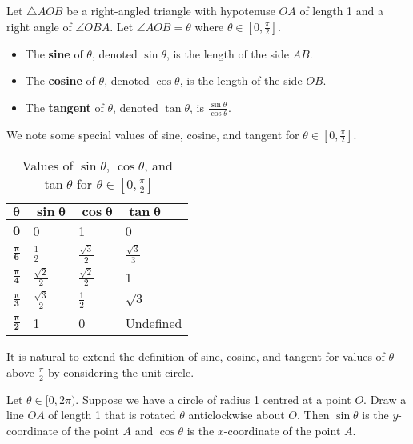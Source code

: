 \begin{definition}
    Let $\triangle AOB$ be a right-angled triangle with hypotenuse $OA$ of length 1 and a right angle of $\angle OBA$. Let $\angle AOB = \theta$ where $\theta \in [0, \frac\pi2]$.
    \begin{itemize}
        \item The \textbf{sine} of $\theta$, denoted $\sin\theta$, is the length of the side $AB$.
        \item The \textbf{cosine} of $\theta$, denoted $\cos\theta$, is the length of the side $OB$.
        \item The \textbf{tangent} of $\theta$, denoted $\tan\theta$, is $\frac{\sin\theta}{\cos\theta}$.
    \end{itemize}
\end{definition}

We note some special values of sine, cosine, and tangent for $\theta \in [0, \frac\pi2]$.

\begin{table}[H]
    \centering
    \begin{tabular}{|l|l|l|l|}
        \hline
        $\boldsymbol{\theta}$ & $\boldsymbol{\sin\theta}$ & $\boldsymbol{\cos\theta}$ & $\boldsymbol{\tan\theta}$ \\ \hline
        $\boldsymbol{0}$ & 0 & 1 & 0 \\ \hline
        $\boldsymbol{\frac\pi6}$ & $\frac12$ & $\frac{\sqrt3}2$ & $\frac{\sqrt3}3$ \\ \hline
        $\boldsymbol{\frac\pi4}$ & $\frac{\sqrt2}2$ & $\frac{\sqrt2}2$ & 1 \\ \hline
        $\boldsymbol{\frac\pi3}$ & $\frac{\sqrt3}2$ & $\frac12$ & $\sqrt3$ \\ \hline
        $\boldsymbol{\frac\pi2}$ & 1 & 0 & Undefined \\ \hline
    \end{tabular}
    \caption{Values of $\sin\theta$, $\cos\theta$, and $\tan\theta$ for $\theta \in [0, \frac\pi2]$}
\end{table}

It is natural to extend the definition of sine, cosine, and tangent for values of $\theta$ above $\frac\pi2$ by considering the unit circle.

\begin{definition}
    Let $\theta \in [0, 2\pi)$. Suppose we have a circle of radius 1 centred at a point $O$. Draw a line $OA$ of length 1 that is rotated $\theta$ anticlockwise about $O$. Then $\sin\theta$ is the $y$-coordinate of the point $A$ and  $\cos\theta$ is the $x$-coordinate of the point $A$.
\end{definition}


